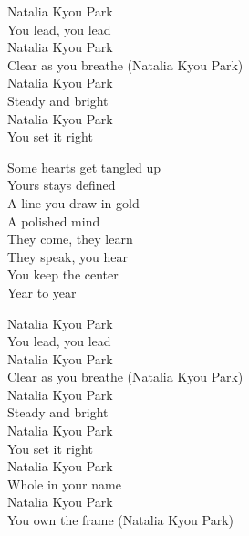 \begin{lyrics}
Natalia Kyou Park\\
You lead, you lead\\
Natalia Kyou Park\\
Clear as you breathe (Natalia Kyou Park)\\
Natalia Kyou Park\\
Steady and bright\\
Natalia Kyou Park\\
You set it right

Some hearts get tangled up\\
Yours stays defined\\
A line you draw in gold\\
A polished mind\\
They come, they learn\\
They speak, you hear\\
You keep the center\\
Year to year

Natalia Kyou Park\\
You lead, you lead\\
Natalia Kyou Park\\
Clear as you breathe (Natalia Kyou Park)\\
Natalia Kyou Park\\
Steady and bright\\
Natalia Kyou Park\\
You set it right\\
Natalia Kyou Park\\
Whole in your name\\
Natalia Kyou Park\\
You own the frame (Natalia Kyou Park)
\end{lyrics}
